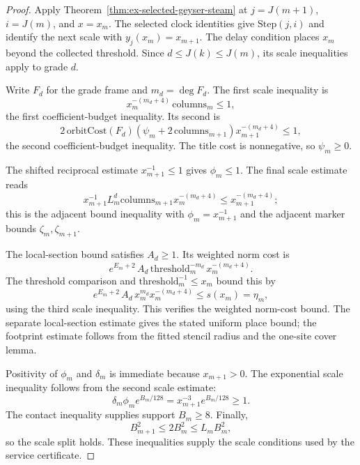 \begin{proof}
Apply Theorem~\ref{thm:ex-selected-geyser-steam} at $j=J(m+1)$, $i=J(m)$, and $x=x_m$. The selected clock identities give $\mathrm{Step}(j,i)$ and identify the next scale with $y_j(x_m)=x_{m+1}$. The delay condition places $x_m$ beyond the collected threshold. Since $d\leq J(k)\leq J(m)$, its scale inequalities apply to grade $d$.

Write $F_d$ for the grade frame and $m_d=\deg F_d$. The first scale inequality is
\[
 x_m^{-(m_d+4)}\,\mathrm{columns}_m\leq1,
\]
the first coefficient-budget inequality. Its second is
\[
2\,\mathrm{orbitCost}(F_d)(\psi_m+2\,\mathrm{columns}_{m+1})x_{m+1}^{-(m_d+4)}\leq1,
\]
the second coefficient-budget inequality. The title cost is nonnegative, so $\psi_m\geq0$.

The shifted reciprocal estimate $x_{m+1}^{-1}\leq1$ gives $\phi_m\leq1$. The final scale estimate reads
\[
 x_{m+1}^{-1}L_m^d\mathrm{columns}_{m+1}x_m^{-(m_d+4)}
 \leq x_{m+1}^{-(m_d+4)};
\]
this is the adjacent bound inequality with $\phi_m=x_{m+1}^{-1}$ and the adjacent marker bounds $\zeta_m,\zeta_{m+1}$.

The local-section bound satisfies $A_d\geq1$. Its weighted norm cost is
\[
 e^{E_m+2}\,A_d\,
      \mathrm{threshold}_m^{-m_d}\,x_m^{-(m_d+4)}.
\]
The threshold comparison and $\mathrm{threshold}_m^{-1}\leq x_m$ bound this by
\[
 e^{E_m+2}\,A_d\,x_m^{m_d}x_m^{-(m_d+4)}
 \leq s(x_m)=\eta_m,
\]
using the third scale inequality. This verifies the weighted norm-cost bound. The separate local-section estimate gives the stated uniform place bound; the footprint estimate follows from the fitted stencil radius and the one-site cover lemma.

Positivity of $\phi_m$ and $\delta_m$ is immediate because $x_{m+1}>0$. The exponential scale inequality follows from the second scale estimate:
\[
 \delta_m\phi_m e^{B_m/128}
 =x_{m+1}^{-3}e^{B_m/128}\geq1.
\]
The contact inequality supplies support $B_m\geq8$. Finally,
\[
 B_{m+1}^2\leq2B_m^2\leq L_mB_m^2,
\]
so the scale split holds. These inequalities supply the scale conditions used by the service certificate.
\end{proof}
